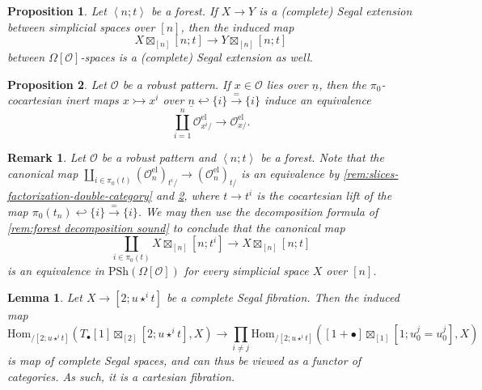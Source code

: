\documentclass[10pt,a4paper]{amsart}
\newtheorem{remark}{Remark}
\newtheorem{proposition}{Proposition}
\newtheorem{lemma}{Lemma}
\newcommand{\Hom}{\mathrm{Hom}}
\renewcommand{\O}{\mathscr{O}}
\newcommand{\PSh}{\mathrm{PSh}}
\newcommand{\Tree}{\Omega}
\newcommand{\el}{\mathrm{el}}
\newcommand{\intarrow}{\rightarrowtail}
\begin{document}
\begin{proposition}\label{prop:simplicial segal extension}
    Let $\left<n;t\right>$ be a forest. If $X \to Y$ is a (complete) Segal extension between simplicial spaces over $[n]$, then 
    the induced map
    $$X \boxtimes_{[n]} [n;t] \to Y \boxtimes_{[n]} [n;t]$$
    between $\Tree[\O]$-spaces is a (complete) Segal extension as well.
\end{proposition}

\begin{proposition}\label{prop:robust elementary slices decomp}
    Let $\O$ be a robust pattern. If $x\in \O$ lies over $\underline{n}$, then the $\pi_0$-cocartesian inert maps $x\intarrow x^i$ over $\underline{n} \hookleftarrow \{i\}\xrightarrow{=}\{i\}$ induce an equivalence
    $$\coprod_{i=1}^n \O^\el_{x^i/} \to \O^\el_{x/}.$$
\end{proposition}

\begin{remark}\label{rem:decomposition by atoms formula}
Let $\O$ be a robust pattern and  $\left<n;t\right>$ be a forest. Note that the canonical map
    $
    \textstyle \coprod_{i\in \pi_0(t)} (\O_n^{\el})_{t^i/} \to (\O_n^{\el})_{t/}
    $ is an equivalence by \cref{rem:slices-factorization-double-category} and \cref{prop:robust elementary slices decomp},
    where $t\to t^i$ is the cocartesian lift of the map $\pi_0(t_n) \hookleftarrow \{i\} \xrightarrow{=} \{i\}$.
   We may then use the decomposition formula of \cref{rem:forest decomposition sound} to conclude that the canonical map 
    $$
    \coprod_{i\in \pi_0(t)} X \boxtimes_{[n]} [n;t^i] \to X \boxtimes_{[n]} [n;t]
    $$
    is an equivalence in $\PSh(\Tree[\O])$ for every simplicial space $X$ over $[n]$.
\end{remark}

\begin{lemma}\label{lemma:a cartesian fib}
Let $X \to [2;u\star^i t]$ be a complete Segal fibration. Then the induced map
$$
\Hom_{/[2;u\star^i t]}(T_\bullet[1]\boxtimes_{[2]}[2;u\star^i t],X) \to \prod_{i\neq j}\Hom_{/[2;u\star^i t]}([1+\bullet]\boxtimes_{[1]}[1;u_0^j =u_0^j],X)
$$
is map of complete Segal spaces, and can thus be viewed as a functor of categories. As such, it is a cartesian fibration.
\end{lemma}
\end{document}

